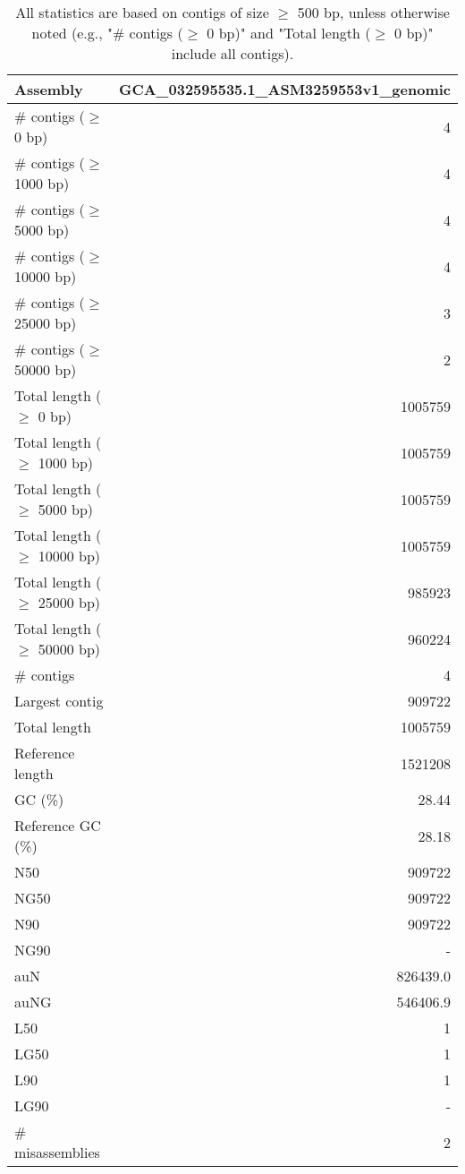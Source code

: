 \documentclass[12pt,a4paper]{article}
\begin{document}
\begin{table}[ht]
\begin{center}
\caption{All statistics are based on contigs of size $\geq$ 500 bp, unless otherwise noted (e.g., "\# contigs ($\geq$ 0 bp)" and "Total length ($\geq$ 0 bp)" include all contigs).}
\begin{tabular}{|l*{1}{|r}|}
\hline
Assembly & GCA\_032595535.1\_ASM3259553v1\_genomic \\ \hline
\# contigs ($\geq$ 0 bp) & 4 \\ \hline
\# contigs ($\geq$ 1000 bp) & 4 \\ \hline
\# contigs ($\geq$ 5000 bp) & 4 \\ \hline
\# contigs ($\geq$ 10000 bp) & 4 \\ \hline
\# contigs ($\geq$ 25000 bp) & 3 \\ \hline
\# contigs ($\geq$ 50000 bp) & 2 \\ \hline
Total length ($\geq$ 0 bp) & 1005759 \\ \hline
Total length ($\geq$ 1000 bp) & 1005759 \\ \hline
Total length ($\geq$ 5000 bp) & 1005759 \\ \hline
Total length ($\geq$ 10000 bp) & 1005759 \\ \hline
Total length ($\geq$ 25000 bp) & 985923 \\ \hline
Total length ($\geq$ 50000 bp) & 960224 \\ \hline
\# contigs & 4 \\ \hline
Largest contig & 909722 \\ \hline
Total length & 1005759 \\ \hline
Reference length & 1521208 \\ \hline
GC (\%) & 28.44 \\ \hline
Reference GC (\%) & 28.18 \\ \hline
N50 & 909722 \\ \hline
NG50 & 909722 \\ \hline
N90 & 909722 \\ \hline
NG90 & - \\ \hline
auN & 826439.0 \\ \hline
auNG & 546406.9 \\ \hline
L50 & 1 \\ \hline
LG50 & 1 \\ \hline
L90 & 1 \\ \hline
LG90 & - \\ \hline
\# misassemblies & 2 \\ \hline

\end{tabular}
\end{center}
\end{table}
\end{document}
